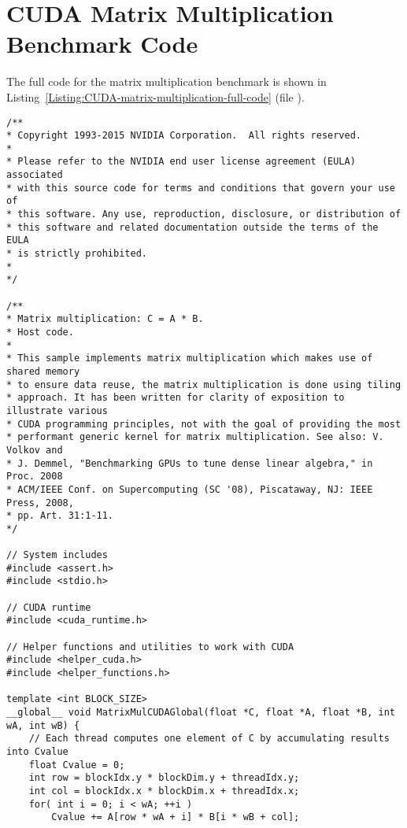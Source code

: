 \newpage 									%
\appendix 								 	%

\chapter{CUDA Matrix Multiplication Benchmark Code}\label{Attachment:CUDA-matrix-multiplication-code}
The full code for the matrix multiplication benchmark is shown in Listing~\ref{Listing:CUDA-matrix-multiplication-full-code} (file ).
\begin{lstlisting}[caption={Matrix multiplication benchmark code. Taken from Nvidia's samples located in the users home directory by default: \code{\$HOME/NVIDIA-samples/0\_Introduction/matrixMul/}.},label={Listing:CUDA-matrix-multiplication-full-code},escapechar=@]
/**
* Copyright 1993-2015 NVIDIA Corporation.  All rights reserved.
*
* Please refer to the NVIDIA end user license agreement (EULA) associated
* with this source code for terms and conditions that govern your use of
* this software. Any use, reproduction, disclosure, or distribution of
* this software and related documentation outside the terms of the EULA
* is strictly prohibited.
*
*/

/**
* Matrix multiplication: C = A * B.
* Host code.
*
* This sample implements matrix multiplication which makes use of shared memory
* to ensure data reuse, the matrix multiplication is done using tiling
* approach. It has been written for clarity of exposition to illustrate various
* CUDA programming principles, not with the goal of providing the most
* performant generic kernel for matrix multiplication. See also: V. Volkov and
* J. Demmel, "Benchmarking GPUs to tune dense linear algebra," in Proc. 2008
* ACM/IEEE Conf. on Supercomputing (SC '08), Piscataway, NJ: IEEE Press, 2008,
* pp. Art. 31:1-11.
*/

// System includes
#include <assert.h>
#include <stdio.h>

// CUDA runtime
#include <cuda_runtime.h>

// Helper functions and utilities to work with CUDA
#include <helper_cuda.h>
#include <helper_functions.h>

template <int BLOCK_SIZE>
__global__ void MatrixMulCUDAGlobal(float *C, float *A, float *B, int wA, int wB) {
	// Each thread computes one element of C by accumulating results into Cvalue
	float Cvalue = 0;
	int row = blockIdx.y * blockDim.y + threadIdx.y;
	int col = blockIdx.x * blockDim.x + threadIdx.x;
	for( int i = 0; i < wA; ++i )
		Cvalue += A[row * wA + i] * B[i * wB + col];
	

\end{lstlisting}
